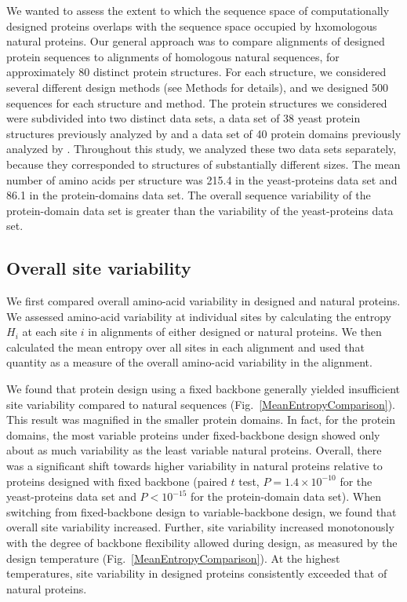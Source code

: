 \documentclass[12pt]{article}
\begin{document}
We wanted to assess the extent to which the sequence space of computationally designed proteins overlaps with the sequence space occupied by hxomologous natural proteins. Our general approach was to compare alignments of designed protein sequences to alignments of homologous natural sequences, for approximately 80 distinct protein structures. For each structure, we considered several different design methods (see Methods for details), and we designed 500 sequences for each structure and method. The protein structures we considered were subdivided into two distinct data sets, a data set of 38 yeast protein structures previously analyzed by \citet{Ramsey2011} and a data set of 40 protein domains previously analyzed by \citet{OllikainenKortemme}. Throughout this study, we analyzed these two data sets separately, because they corresponded to structures of substantially different sizes. The mean number of amino acids per structure was 215.4 in the yeast-proteins data set and 86.1 in the protein-domains data set. The overall sequence variability of the protein-domain data set is greater than the variability of the yeast-proteins data set. 

\subsection{Overall site variability}
\label{SiteVariability}

We first compared overall amino-acid variability in designed and natural proteins. We assessed amino-acid variability at individual sites by calculating the entropy $H_i$ at each site $i$ in alignments of either designed or natural proteins. We then calculated the mean entropy over all sites in each alignment and used that quantity as a measure of the overall amino-acid variability in the alignment.

We found that protein design using a fixed backbone generally yielded insufficient site variability compared to natural sequences (Fig.~\ref{MeanEntropyComparison}).  This result was magnified in the smaller protein domains. In fact, for the protein domains, the most variable proteins under fixed-backbone design showed only about as much variability as the least variable natural proteins. Overall, there was a significant shift towards higher variability in natural proteins relative to proteins designed with fixed backbone (paired $t$ test, $P = 1.4\times10^{-10}$ for the yeast-proteins data set and $P<10^{-15}$ for the protein-domain data set). When switching from fixed-backbone design to variable-backbone design, we found that overall site variability increased. Further, site variability increased monotonously with the degree of backbone flexibility allowed during design, as measured by the design temperature (Fig.~\ref{MeanEntropyComparison}). At the highest temperatures, site variability in designed proteins consistently exceeded that of natural proteins. 
\end{document}
